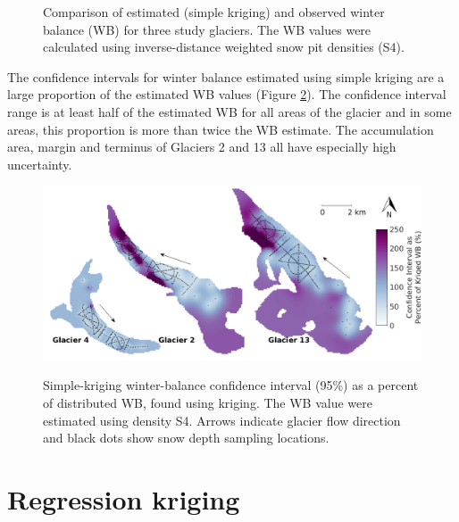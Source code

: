 \documentclass{sfuthesis}
\newcommand{\topomap}{Arrows indicate glacier flow direction and black dots show snow depth sampling locations. }
\begin{document}
\begin{figure}[H]
	\caption{Comparison of estimated (simple kriging) and observed winter balance (WB) for three study glaciers. The WB values were calculated using inverse-distance weighted snow pit densities (S4).}
	\label{fig:R2simplekrig}
\end{figure}

The confidence intervals for winter balance estimated using simple kriging are a large proportion of the estimated WB values (Figure \ref{fig:krigingCI_percent}). The confidence interval range is at least half of the estimated WB for all areas of the glacier and in some areas, this proportion is more than twice the WB estimate. The accumulation area, margin and terminus of Glaciers 2 and 13 all have especially high uncertainty. 

\begin{figure}[H]
	\centering
	\includegraphics[width = \textwidth]{KrigingCI_percent.png}\\
	\caption{Simple-kriging winter-balance confidence interval (95\%) as a percent of distributed WB, found using kriging. The WB value were estimated using density S4. \topomap}
	\label{fig:krigingCI_percent}
\end{figure}

\section{Regression kriging}
\label{sec:regressionkriging}
\end{document}
